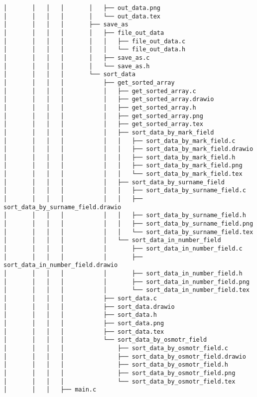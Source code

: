 \begin{verbatim}
│       │   │   │       │   ├── out_data.png
│       │   │   │       │   └── out_data.tex
│       │   │   │       ├── save_as
│       │   │   │       │   ├── file_out_data
│       │   │   │       │   │   ├── file_out_data.c
│       │   │   │       │   │   └── file_out_data.h
│       │   │   │       │   ├── save_as.c
│       │   │   │       │   └── save_as.h
│       │   │   │       └── sort_data
│       │   │   │           ├── get_sorted_array
│       │   │   │           │   ├── get_sorted_array.c
│       │   │   │           │   ├── get_sorted_array.drawio
│       │   │   │           │   ├── get_sorted_array.h
│       │   │   │           │   ├── get_sorted_array.png
│       │   │   │           │   ├── get_sorted_array.tex
│       │   │   │           │   ├── sort_data_by_mark_field
│       │   │   │           │   │   ├── sort_data_by_mark_field.c
│       │   │   │           │   │   ├── sort_data_by_mark_field.drawio
│       │   │   │           │   │   ├── sort_data_by_mark_field.h
│       │   │   │           │   │   ├── sort_data_by_mark_field.png
│       │   │   │           │   │   └── sort_data_by_mark_field.tex
│       │   │   │           │   ├── sort_data_by_surname_field
│       │   │   │           │   │   ├── sort_data_by_surname_field.c
│       │   │   │           │   │   ├── sort_data_by_surname_field.drawio
│       │   │   │           │   │   ├── sort_data_by_surname_field.h
│       │   │   │           │   │   ├── sort_data_by_surname_field.png
│       │   │   │           │   │   └── sort_data_by_surname_field.tex
│       │   │   │           │   └── sort_data_in_number_field
│       │   │   │           │       ├── sort_data_in_number_field.c
│       │   │   │           │       ├── sort_data_in_number_field.drawio
│       │   │   │           │       ├── sort_data_in_number_field.h
│       │   │   │           │       ├── sort_data_in_number_field.png
│       │   │   │           │       └── sort_data_in_number_field.tex
│       │   │   │           ├── sort_data.c
│       │   │   │           ├── sort_data.drawio
│       │   │   │           ├── sort_data.h
│       │   │   │           ├── sort_data.png
│       │   │   │           ├── sort_data.tex
│       │   │   │           └── sort_data_by_osmotr_field
│       │   │   │               ├── sort_data_by_osmotr_field.c
│       │   │   │               ├── sort_data_by_osmotr_field.drawio
│       │   │   │               ├── sort_data_by_osmotr_field.h
│       │   │   │               ├── sort_data_by_osmotr_field.png
│       │   │   │               └── sort_data_by_osmotr_field.tex
│       │   │   ├── main.c

\end{verbatim}
